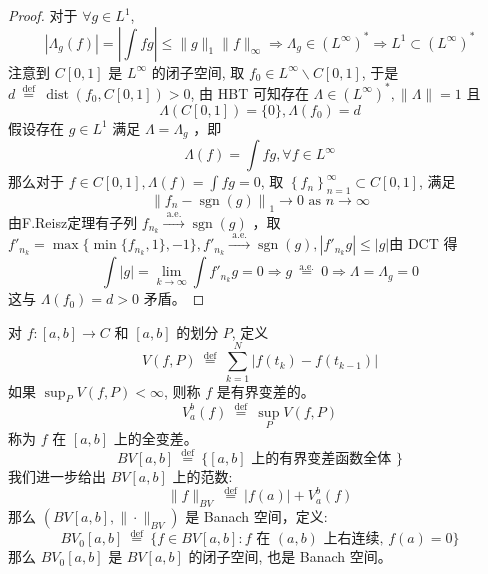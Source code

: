 \documentclass[lang=cn,newtx,10pt,scheme=chinese,thmcnt=chapter]{elegantbook}
\begin{document}
\begin{proof}
对于 $\forall g \in L^1$,
\begin{equation*}
\left|\Lambda_g(f)\right|=\left|\int f g\right| \leqslant\|g\|_1\|f\|_{\infty} \Rightarrow \Lambda_g \in\left(L^{\infty}\right)^* \Rightarrow L^1 \subset\left(L^{\infty}\right)^*
\end{equation*}
注意到 $C[0,1]$ 是 $L^{\infty}$ 的闭子空间, 取 $f_0 \in L^{\infty} \backslash C[0,1]$, 于是 $d \stackrel{\text { def }}{=} \operatorname{dist}\left(f_0, C[0,1]\right)>0$, 由 HBT 可知存在 $\Lambda \in$$\left(L^{\infty}\right)^*,\|\Lambda\|=1$ 且
\begin{equation*}
\Lambda(C[0,1])=\{0\}, \Lambda\left(f_0\right)=d
\end{equation*}
假设存在 $g \in L^1$ 满足 $\Lambda=\Lambda_g$ ，即
\begin{equation*}
\Lambda(f)=\int f g, \forall f \in L^{\infty}
\end{equation*}
那么对于 $f \in C[0,1], \Lambda(f)=\int f g=0$, 取 $\left\{f_n\right\}_{n=1}^{\infty} \subset C[0,1]$, 满足
\begin{equation*}
\left\|f_n-\operatorname{sgn}(g)\right\|_1 \rightarrow 0 \text { as } n \rightarrow \infty
\end{equation*}
由F.Reisz定理有子列 $f_{n_k} \xrightarrow{\text { a.e. }} \operatorname{sgn}(g)$ ，取$f'_{n_k}=\max\{\min\{f_{n_k},1\},-1\},f'_{n_k} \xrightarrow{\text { a.e. }} \operatorname{sgn}(g),| f'_{n_k} g|\leqslant |g|$由 DCT 得
\begin{equation*}
\int|g|=\lim _{k \rightarrow \infty} \int f'_{n_k} g=0 \Rightarrow g \stackrel{\text { a.e. }}{=} 0 \Rightarrow \Lambda=\Lambda_g=0
\end{equation*}
这与 $\Lambda\left(f_0\right)=d>0$ 矛盾。
\end{proof}
\begin{definition}
对 $f:[a, b] \rightarrow C$ 和 $[a, b]$ 的划分 $P$, 定义
\begin{equation*}
V(f, P) \stackrel{\text { def }}{=} \sum_{k=1}^N\left|f\left(t_k\right)-f\left(t_{k-1}\right)\right|
\end{equation*}
如果 $\sup _P V(f, P)<\infty$, 则称 $f$ 是有界变差的。
\begin{equation*}
V_a^b(f) \stackrel{\text { def }}{=} \sup _P V(f, P)
\end{equation*}
称为 $f$ 在 $[a, b]$ 上的全变差。
\begin{equation*}
B V[a, b] \stackrel{\text { def }}{=}\{[a, b] \text { 上的有界变差函数全体 }\}
\end{equation*}
我们进一步给出 $B V[a, b]$ 上的范数:
\begin{equation*}
\|f\|_{B V} \stackrel{\text { def }}{=}|f(a)|+V_a^b(f)
\end{equation*}
那么 $\left(B V[a, b],\|\cdot\|_{B V}\right)$ 是 Banach 空间，定义:
\begin{equation*}
B V_0[a, b] \stackrel{\text { def }}{=}\{f \in B V[a, b]: f \text { 在 }(a, b) \text { 上右连续, } f(a)=0\}
\end{equation*}
那么 $B V_0[a, b]$ 是 $B V[a, b]$ 的闭子空间, 也是 Banach 空间。
\end{definition}
\end{document}
